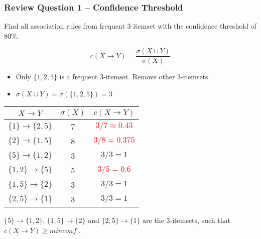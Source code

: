 \documentclass[aspectratio=169, 10pt]{beamer}
\begin{document}
\begin{frame}[t]
    \frametitle{Review Question 1 -- Confidence Threshold}
    \small

    Find all association rules from frequent 3-itemset with the confidence threshold of 80\%.
    
    \[ c(X \to Y) = \frac{\sigma(X \cup Y)}{\sigma(X)} \] 

    \begin{itemize}
        \item Only $\{1, 2, 5\}$ is a frequent 3-itemset. Remove other 3-itemsets.
        \item $\sigma(X \cup Y) = \sigma (\{ 1, 2, 5\}) = 3$
    \end{itemize}

    \begin{table}[]
        \footnotesize
        \begin{tabular}{c|c|c}
        $X \to Y$                & $\sigma(X)$ & $c(X \to Y)$ \\ \hline
        $\{ 1 \} \to \{  2, 5\}$ & 7           & \textcolor{red}{$3/7 \approx 0.43$} \\ 
        $\{ 2 \} \to \{  1, 5\}$ & 8           & \textcolor{red}{$3/8 = 0.375$} \\ 
        $\{ 5 \} \to \{  1, 2\}$ & 3           & $3/3 = 1$ \\ 
        $\{ 1, 2 \} \to \{  5\}$ & 5           & \textcolor{red}{$3/5 = 0.6$} \\ 
        $\{ 1, 5 \} \to \{  2\}$ & 3           & $3/3 = 1$ \\ 
        $\{ 2, 5 \} \to \{  1\}$ & 3           & $3/3 = 1$ \\ 
        \end{tabular}
    \end{table}

    $\{ 5 \} \to \{  1, 2\}$, $\{ 1, 5 \} \to \{  2\}$ and $\{ 2, 5 \} \to \{  1\}$ are the 3-itemsets, such that $c(X \to Y) \geq \textit{minconf}$ .

\end{frame}
\end{document}
